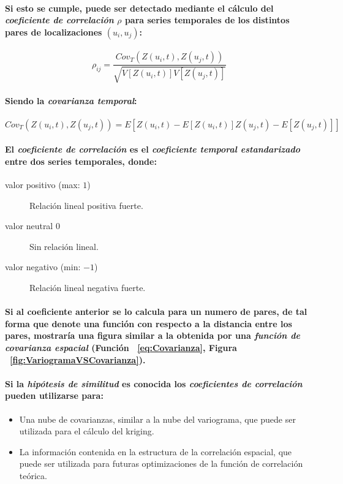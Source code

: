 \paragraph{
Si esto se cumple, puede ser detectado mediante el cálculo del \emph{coeficiente de correlación} $\rho$ para series temporales de los distintos pares de localizaciones $(u_i,u_j)$:
}
\begin{equation}
\rho_{ij} = \frac{Cov_T(Z(u_i,t),Z(u_j,t))}{\sqrt{V[Z(u_i,t)] V[Z(u_j,t)]}}
\end{equation}
\paragraph{
Siendo la \emph{covarianza temporal}:
}
\begin{equation}
Cov_T(Z(u_i,t),Z(u_j,t)) = E[{Z(u_i,t) - E[Z(u_i,t)]} {Z(u_j,t) - E[Z(u_j,t)]}]
\end{equation}
\paragraph{
El \emph{coeficiente de correlación} es el \emph{coeficiente temporal estandarizado} entre dos series temporales, donde:
}
\begin{description}
\item[valor positivo (max: $1$)] Relación lineal positiva fuerte.
\item[valor neutral $0$] Sin relación lineal.
\item[valor negativo (min: $-1$)] Relación lineal negativa fuerte.
\end{description}
\paragraph{
Si al coeficiente anterior se lo calcula para un numero de pares, de tal forma que denote una función con respecto a la distancia entre los pares, mostraría una figura similar a la obtenida por una \emph{función de covarianza espacial} (Función ~\ref{eq:Covarianza}, Figura ~\ref{fig:VariogramaVSCovarianza}).
}
\paragraph{
Si la \emph{hipótesis de similitud} es conocida los \emph{coeficientes de correlación} pueden utilizarse para:
}
\begin{itemize}
\item Una nube de covarianzas, similar a la nube del variograma, que puede ser utilizada para el cálculo del kriging.
\item La información contenida en la estructura de la correlación espacial, que puede ser utilizada para futuras optimizaciones de la función de correlación teórica.
\end{itemize}